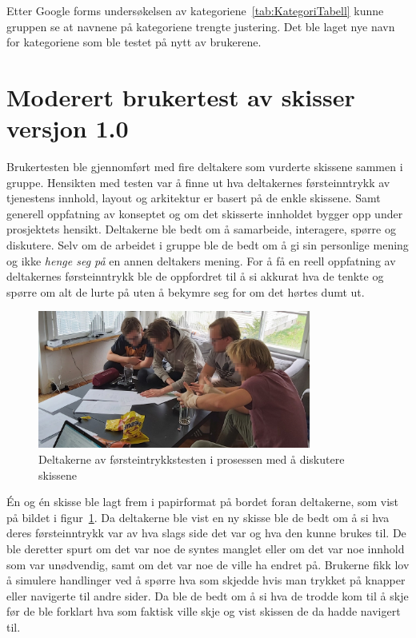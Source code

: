 Etter Google forms undersøkelsen av kategoriene~\ref{tab:KategoriTabell} kunne gruppen se at navnene på kategoriene trengte justering. Det ble laget nye navn for kategoriene som ble testet på nytt av brukerene. 

\section{Moderert brukertest av skisser versjon 1.0}
\label{section:Moderert brukertest-skisser-1}

Brukertesten ble gjennomført med fire deltakere som vurderte skissene sammen i gruppe. Hensikten med testen var å finne ut hva deltakernes førsteinntrykk av tjenestens innhold, layout og arkitektur er basert på de enkle skissene. Samt generell oppfatning av konseptet og om det skisserte innholdet bygger opp under prosjektets hensikt. Deltakerne ble bedt om å samarbeide, interagere, spørre og diskutere. Selv om de arbeidet i gruppe ble de bedt om å gi sin personlige mening og ikke {\em henge seg på} en annen deltakers mening. For å få en reell oppfatning av deltakernes førsteinntrykk ble de oppfordret til å si akkurat hva de tenkte og spørre om alt de lurte på uten å bekymre seg for om det hørtes dumt ut.


\begin{figure}[H]
\includegraphics[width=0.8\textwidth]{Illustrasjoner/skissetest-bilde.jpg}
\centering
\caption{Deltakerne av førsteintrykkstesten i prosessen med å diskutere skissene}
\label{fig:skissetest}
\end{figure}

Én og én skisse ble lagt frem i papirformat på bordet foran deltakerne, som vist på bildet i figur~\ref{fig:skissetest}. Da deltakerne ble vist en ny skisse ble de bedt om å si hva deres førsteinntrykk var av hva slags side det var og hva den kunne brukes til. De ble deretter spurt om det var noe de syntes manglet eller om det var noe innhold som var unødvendig, samt om det var noe de ville ha endret på. Brukerne fikk lov å simulere handlinger ved å spørre hva som skjedde hvis man trykket på knapper eller navigerte til andre sider. Da ble de bedt om å si hva de trodde kom til å skje før de ble forklart hva som faktisk ville skje og vist skissen de da hadde navigert til.

